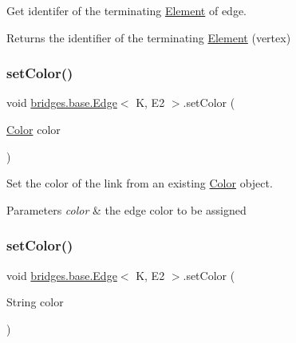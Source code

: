 Get identifer of the terminating \mbox{\hyperlink{classbridges_1_1base_1_1_element}{Element}} of edge. 

\begin{DoxyReturn}{Returns}
the identifier of the terminating \mbox{\hyperlink{classbridges_1_1base_1_1_element}{Element}} (vertex) 
\end{DoxyReturn}
\mbox{\label{classbridges_1_1base_1_1_edge_a77f6d36e94a3cbb8e478c85a1a6dad84}} 
\subsubsection{\texorpdfstring{set\+Color()}{setColor()}\hspace{0.1cm}{\footnotesize\ttfamily [1/3]}}
{\footnotesize\ttfamily void \mbox{\hyperlink{classbridges_1_1base_1_1_edge}{bridges.\+base.\+Edge}}$<$ K, E2 $>$.set\+Color (\begin{DoxyParamCaption}\item[{\mbox{\hyperlink{classbridges_1_1base_1_1_color}{Color}}}]{color }\end{DoxyParamCaption})}



Set the color of the link from an existing \mbox{\hyperlink{classbridges_1_1base_1_1_color}{Color}} object. 


\begin{DoxyParams}{Parameters}
{\em color} & the edge color to be assigned \\
\hline
\end{DoxyParams}
\mbox{\label{classbridges_1_1base_1_1_edge_adc2dbd9f8d74f8749ba64515ca052909}} 
\subsubsection{\texorpdfstring{set\+Color()}{setColor()}\hspace{0.1cm}{\footnotesize\ttfamily [2/3]}}
{\footnotesize\ttfamily void \mbox{\hyperlink{classbridges_1_1base_1_1_edge}{bridges.\+base.\+Edge}}$<$ K, E2 $>$.set\+Color (\begin{DoxyParamCaption}\item[{String}]{color }\end{DoxyParamCaption})}



